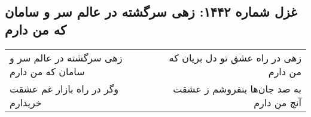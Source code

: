 \begin{center}
\section*{غزل شماره ۱۴۴۲: زهی سرگشته در عالم سر و سامان که من دارم}
\label{sec:1442}
\begin{longtable}{l p{0.5cm} r}
زهی سرگشته در عالم سر و سامان که من دارم
&&
زهی در راه عشق تو دل بریان که من دارم
\\
وگر در راه بازار غم عشقت خریدارم
&&
به صد جان‌ها بنفروشم ز عشقت آنچ من دارم
\\
\end{longtable}
\end{center}
